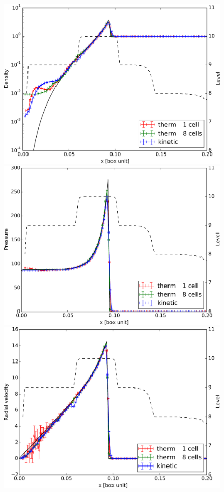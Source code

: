\begin{figure}
\begin{minipage}[c]{.5\linewidth}
   \end{minipage} \hfill
   \begin{minipage}[c]{.5\linewidth}
		
		\includegraphics[width=\textwidth]{img/03/sedov/sedov_comp_profile_den.pdf} 
		\includegraphics[width=\textwidth]{img/03/sedov/sedov_comp_profile_pres.pdf} 
		\includegraphics[width=\textwidth]{img/03/sedov/sedov_comp_profile_vel.pdf} 


\end{minipage}
\end{figure}

